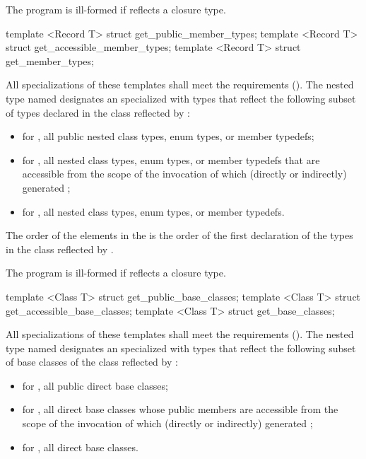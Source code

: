 \begin{std.txt}
\begin{itemdescr}
\pnum
\remarks
The program is ill-formed if  reflects a closure type.
\end{itemdescr}

\begin{itemdecl}
template <Record T> struct get_public_member_types;
template <Record T> struct get_accessible_member_types;
template <Record T> struct get_member_types;
\end{itemdecl}

\begin{itemdescr}
\pnum
All specializations of these templates shall meet the  requirements (). The nested type named  designates an  specialized with  types that reflect the following subset of types declared in the class reflected by :
\begin{itemize}
  \item for , all public nested class types, enum types, or member typedefs;
  \item for , all nested class types, enum types, or member typedefs that are accessible from the scope of the invocation of  which (directly or indirectly) generated ;
  \item for , all nested class types, enum types, or member typedefs.
\end{itemize}

\pnum
The order of the elements in the  is the order of the first declaration of the types in the class reflected by .

\pnum
\remarks
The program is ill-formed if  reflects a closure type.
\end{itemdescr}

\begin{itemdecl}
template <Class T> struct get_public_base_classes;
template <Class T> struct get_accessible_base_classes;
template <Class T> struct get_base_classes;
\end{itemdecl}

\begin{itemdescr}
\pnum
All specializations of these templates shall meet the  requirements (). The nested type named  designates an  specialized with  types that reflect the following subset of base classes of the class reflected by :
\begin{itemize}
  \item for , all public direct base classes;
  \item for , all direct base classes whose public members are accessible from the scope of the invocation of  which (directly or indirectly) generated ;
  \item for , all direct base classes.
\end{itemize}


\end{itemdescr}
\end{std.txt}
